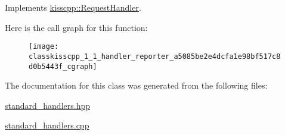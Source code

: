Implements \hyperlink{classkisscpp_1_1_request_handler_a3606f772c07297826847a8e36226cdaa}{kisscpp\-::\-Request\-Handler}.



Here is the call graph for this function\-:\nopagebreak
\begin{figure}[H]
\begin{center}
\leavevmode
\texttt{[image: classkisscpp\_1\_1\_handler\_reporter\_a5085be2e4dcfa1e98bf517c8d0b5443f\_cgraph]}
\end{center}
\end{figure}




The documentation for this class was generated from the following files\-:\begin{DoxyCompactItemize}
\item 
\hyperlink{standard__handlers_8hpp}{standard\-\_\-handlers.\-hpp}\item 
\hyperlink{standard__handlers_8cpp}{standard\-\_\-handlers.\-cpp}\end{DoxyCompactItemize}
